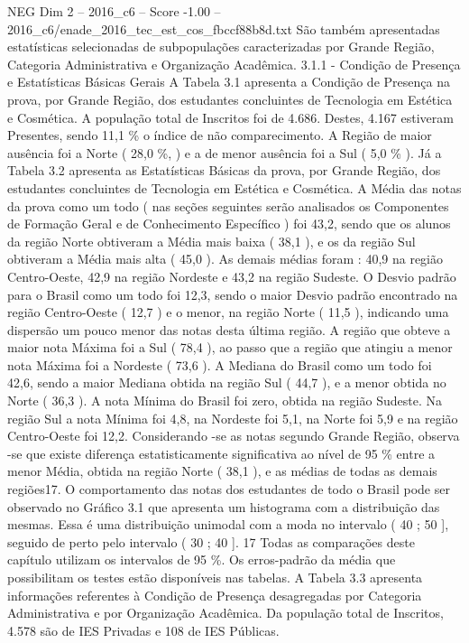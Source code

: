 \begin{textsample}{NEG Dim 2 – 2016\_c6 – Score -1.00 – 2016\_c6/enade\_2016\_tec\_est\_cos\_fbccf88b8d.txt}
São também apresentadas estatísticas selecionadas de subpopulações caracterizadas por Grande Região, Categoria Administrativa e Organização Acadêmica. 3.1.1 - Condição de Presença e Estatísticas Básicas Gerais A Tabela 3.1 apresenta a Condição de Presença na prova, por Grande Região, dos estudantes concluintes de Tecnologia em Estética e Cosmética.
A população total de Inscritos foi de 4.686.
Destes, 4.167 estiveram Presentes, sendo 11,1 \% o índice de não comparecimento.
A Região de maior ausência foi a Norte ( 28,0 \%, ) e a de menor ausência foi a Sul ( 5,0 \% ).
Já a Tabela 3.2 apresenta as Estatísticas Básicas da prova, por Grande Região, dos estudantes concluintes de Tecnologia em Estética e Cosmética.
A Média das notas da prova como um todo ( nas seções seguintes serão analisados os Componentes de Formação Geral e de Conhecimento Específico ) foi 43,2, sendo que os alunos da região Norte obtiveram a Média mais baixa ( 38,1 ), e os da região Sul obtiveram a Média mais alta ( 45,0 ).
As demais médias foram : 40,9 na região Centro-Oeste, 42,9 na região Nordeste e 43,2 na região Sudeste.
O Desvio padrão para o Brasil como um todo foi 12,3, sendo o maior Desvio padrão encontrado na região Centro-Oeste ( 12,7 ) e o menor, na região Norte ( 11,5 ), indicando uma dispersão um pouco menor das notas desta última região.
A região que obteve a maior nota Máxima foi a Sul ( 78,4 ), ao passo que a região que atingiu a menor nota Máxima foi a Nordeste ( 73,6 ).
A Mediana do Brasil como um todo foi 42,6, sendo a maior Mediana obtida na região Sul ( 44,7 ), e a menor obtida no Norte ( 36,3 ).
A nota Mínima do Brasil foi zero, obtida na região Sudeste.
Na região Sul a nota Mínima foi 4,8, na Nordeste foi 5,1, na Norte foi 5,9 e na região Centro-Oeste foi 12,2.
Considerando -se as notas segundo Grande Região, observa -se que existe diferença estatisticamente significativa ao nível de 95 \% entre a menor Média, obtida na região Norte ( 38,1 ), e as médias de todas as demais regiões17.
O comportamento das notas dos estudantes de todo o Brasil pode ser observado no Gráfico 3.1 que apresenta um histograma com a distribuição das mesmas.
Essa é uma distribuição unimodal com a moda no intervalo ( 40 ; 50 ], seguido de perto pelo intervalo ( 30 ; 40 ]. 17 Todas as comparações deste capítulo utilizam os intervalos de 95 \%.
Os erros-padrão da média que possibilitam os testes estão disponíveis nas tabelas.
A Tabela 3.3 apresenta informações referentes à Condição de Presença desagregadas por Categoria Administrativa e por Organização Acadêmica.
Da população total de Inscritos, 4.578 são de IES Privadas e 108 de IES Públicas.

\end{textsample}
